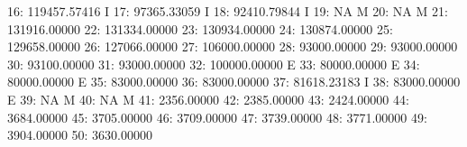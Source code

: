 \documentclass[nojss]{jss}
\begin{document}
\begin{Schunk}
\begin{Soutput}
 16:               119457.57416                                          I
 17:                97365.33059                                          I
 18:                92410.79844                                          I
 19:                         NA                                          M
 20:                         NA                                          M
 21:               131916.00000                                           
 22:               131334.00000                                           
 23:               130934.00000                                           
 24:               130874.00000                                           
 25:               129658.00000                                           
 26:               127066.00000                                           
 27:               106000.00000                                           
 28:                93000.00000                                           
 29:                93000.00000                                           
 30:                93100.00000                                           
 31:                93000.00000                                           
 32:               100000.00000                                          E
 33:                80000.00000                                          E
 34:                80000.00000                                          E
 35:                83000.00000                                           
 36:                83000.00000                                           
 37:                81618.23183                                          I
 38:                83000.00000                                          E
 39:                         NA                                          M
 40:                         NA                                          M
 41:                 2356.00000                                           
 42:                 2385.00000                                           
 43:                 2424.00000                                           
 44:                 3684.00000                                           
 45:                 3705.00000                                           
 46:                 3709.00000                                           
 47:                 3739.00000                                           
 48:                 3771.00000                                           
 49:                 3904.00000                                           
 50:                 3630.00000                                           

\end{Soutput}
\end{Schunk}
\end{document}
